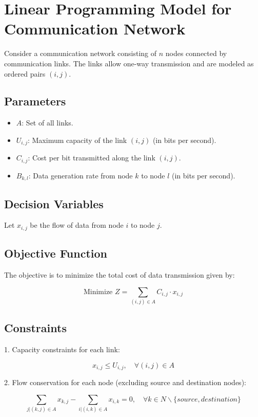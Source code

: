 \documentclass{article}
\begin{document}
\section*{Linear Programming Model for Communication Network}

Consider a communication network consisting of \( n \) nodes connected by communication links. The links allow one-way transmission and are modeled as ordered pairs \( (i, j) \).

\subsection*{Parameters}
\begin{itemize}
    \item \( A \): Set of all links.
    \item \( U_{i,j} \): Maximum capacity of the link \( (i, j) \) (in bits per second).
    \item \( C_{i,j} \): Cost per bit transmitted along the link \( (i, j) \).
    \item \( B_{k,l} \): Data generation rate from node \( k \) to node \( l \) (in bits per second).
\end{itemize}

\subsection*{Decision Variables}
Let \( x_{i,j} \) be the flow of data from node \( i \) to node \( j \).

\subsection*{Objective Function}
The objective is to minimize the total cost of data transmission given by:

\[
\text{Minimize } Z = \sum_{(i,j) \in A} C_{i,j} \cdot x_{i,j}
\]

\subsection*{Constraints}
1. Capacity constraints for each link:

\[
x_{i,j} \leq U_{i,j}, \quad \forall (i,j) \in A
\]

2. Flow conservation for each node (excluding source and destination nodes):

\[
\sum_{j | (k,j) \in A} x_{k,j} - \sum_{i | (i,k) \in A} x_{i,k} = 0, \quad \forall k \in N \backslash \{source, destination\}
\]
\end{document}
